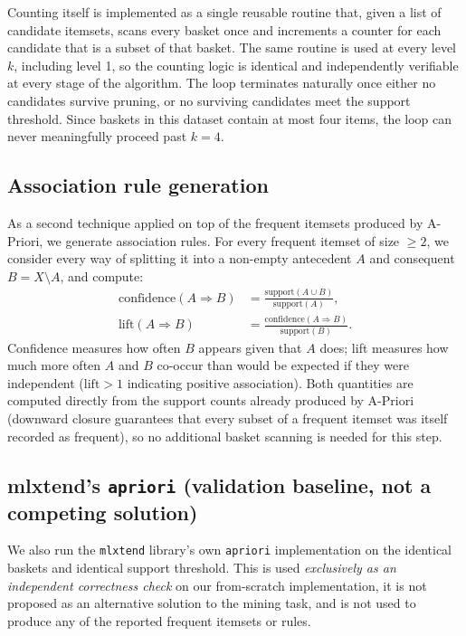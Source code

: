 \documentclass[11pt,a4paper]{article}
\begin{document}
Counting itself is implemented as a single reusable routine that, given a list
of candidate itemsets, scans every basket once and increments a counter for
each candidate that is a subset of that basket. The same routine is used at
every level $k$, including level 1, so the counting logic is identical and
independently verifiable at every stage of the algorithm. The loop terminates
naturally once either no candidates survive pruning, or no surviving
candidates meet the support threshold. Since baskets in this dataset contain
at most four items, the loop can never meaningfully proceed past $k=4$.

\subsection{Association rule generation}

As a second technique applied on top of the frequent itemsets produced by
A-Priori, we generate association rules. For every frequent itemset of size
$\ge 2$, we consider every way of splitting it into a non-empty antecedent $A$
and consequent $B = X \setminus A$, and compute:
\begin{align}
    \text{confidence}(A \Rightarrow B) &= \frac{\text{support}(A \cup B)}{\text{support}(A)}, \\
    \text{lift}(A \Rightarrow B) &= \frac{\text{confidence}(A \Rightarrow B)}{\text{support}(B)}.
\end{align}
Confidence measures how often $B$ appears given that $A$ does; lift measures
how much more often $A$ and $B$ co-occur than would be expected if they were
independent ($\text{lift} > 1$ indicating positive association). Both
quantities are computed directly from the support counts already produced by
A-Priori (downward closure guarantees that every subset of a frequent itemset
was itself recorded as frequent), so no additional basket scanning is needed
for this step.

\subsection{mlxtend's \texttt{apriori} (validation baseline, not a competing solution)}

We also run the \texttt{mlxtend} library's own \texttt{apriori}
implementation on the identical baskets and identical support threshold. This
is used \emph{exclusively as an independent correctness check} on our
from-scratch implementation, it is not proposed as an alternative solution to the mining task, and is not used to produce any
of the reported frequent itemsets or rules.
\end{document}
